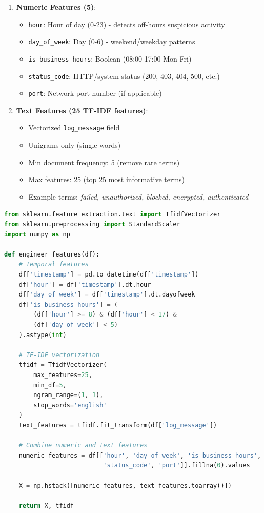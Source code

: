 \documentclass[11pt,conference]{IEEEtran}
\begin{document}
\begin{enumerate}
    \item \textbf{Numeric Features (5)}:
    \begin{itemize}
        \item \texttt{hour}: Hour of day (0-23) - detects off-hours suspicious activity
        \item \texttt{day\_of\_week}: Day (0-6) - weekend/weekday patterns
        \item \texttt{is\_business\_hours}: Boolean (08:00-17:00 Mon-Fri)
        \item \texttt{status\_code}: HTTP/system status (200, 403, 404, 500, etc.)
        \item \texttt{port}: Network port number (if applicable)
    \end{itemize}

    \item \textbf{Text Features (25 TF-IDF features)}:
    \begin{itemize}
        \item Vectorized \texttt{log\_message} field
        \item Unigrams only (single words)
        \item Min document frequency: 5 (remove rare terms)
        \item Max features: 25 (top 25 most informative terms)
        \item Example terms: \textit{failed, unauthorized, blocked, encrypted, authenticated}
    \end{itemize}
\end{enumerate}

\begin{lstlisting}[language=Python]
from sklearn.feature_extraction.text import TfidfVectorizer
from sklearn.preprocessing import StandardScaler
import numpy as np

def engineer_features(df):
    # Temporal features
    df['timestamp'] = pd.to_datetime(df['timestamp'])
    df['hour'] = df['timestamp'].dt.hour
    df['day_of_week'] = df['timestamp'].dt.dayofweek
    df['is_business_hours'] = (
        (df['hour'] >= 8) & (df['hour'] < 17) &
        (df['day_of_week'] < 5)
    ).astype(int)

    # TF-IDF vectorization
    tfidf = TfidfVectorizer(
        max_features=25,
        min_df=5,
        ngram_range=(1, 1),
        stop_words='english'
    )
    text_features = tfidf.fit_transform(df['log_message'])

    # Combine numeric and text features
    numeric_features = df[['hour', 'day_of_week', 'is_business_hours',
                           'status_code', 'port']].fillna(0).values

    X = np.hstack([numeric_features, text_features.toarray()])

    return X, tfidf
\end{lstlisting}
\end{document}
